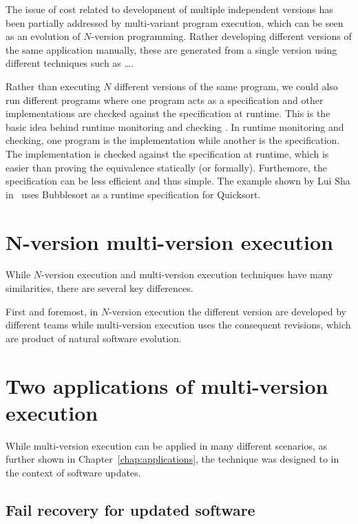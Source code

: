 The issue of cost related to development of multiple independent versions has
been partially addressed by multi-variant program execution, which can be seen
as an evolution of $N$-version programming. Rather developing different versions
of the same application manually, these are generated from a single version
using different techniques such as \ldots.

Rather than executing $N$ different versions of the same program, we could also
run different programs where one program acts as a specification and other
implementations are checked against the specification at runtime.  This is the
basic idea behind runtime monitoring and checking . In runtime
monitoring and checking, one program is the implementation while another is the
specification. The implementation is checked against the specification at
runtime, which is easier than proving the equivalence statically (or formally).
Furthemore, the specification can be less efficient and thus simple. The example
shown by Lui Sha in~\cite{lui01} uses Bubblesort as a runtime specification for
Quicksort.


\section{N-version \vs multi-version execution}

While $N$-version execution and multi-version execution techniques have many
similarities, there are several key differences.

First and foremost, in $N$-version execution the different version are developed
by different teams while multi-version execution uses the consequent revisions,
which are product of natural software evolution.

\section{Two applications of multi-version execution}

While multi-version execution can be applied in many different scenarios, as
further shown in Chapter~\ref{chap:applications}, the technique was designed to
in the context of software updates.  

\subsection{Fail recovery for updated software}
